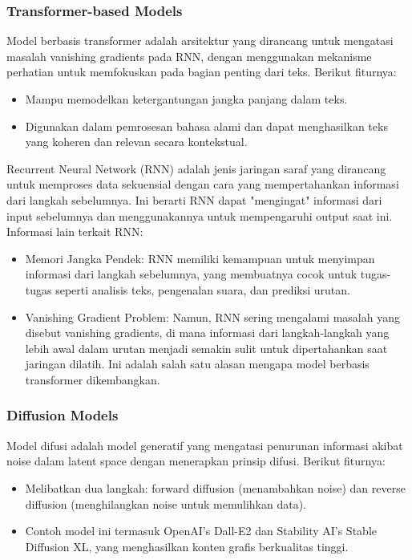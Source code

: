 \documentclass{article}
\begin{document}
\subsubsection{Transformer-based Models}
Model berbasis transformer adalah arsitektur yang dirancang untuk mengatasi masalah vanishing gradients pada RNN, dengan menggunakan mekanisme perhatian untuk memfokuskan pada bagian penting dari teks. Berikut fiturnya:
\begin{itemize}
    \item Mampu memodelkan ketergantungan jangka panjang dalam teks.
    \item Digunakan dalam pemrosesan bahasa alami dan dapat menghasilkan teks yang koheren dan relevan secara kontekstual.
\end{itemize}

Recurrent Neural Network (RNN) adalah jenis jaringan saraf yang dirancang untuk memproses data sekuensial dengan cara yang mempertahankan informasi dari langkah sebelumnya. Ini berarti RNN dapat "mengingat" informasi dari input sebelumnya dan menggunakannya untuk mempengaruhi output saat ini. Informasi lain terkait RNN:
\begin{itemize}
    \item Memori Jangka Pendek: RNN memiliki kemampuan untuk menyimpan informasi dari langkah sebelumnya, yang membuatnya cocok untuk tugas-tugas seperti analisis teks, pengenalan suara, dan prediksi urutan.
    \item Vanishing Gradient Problem: Namun, RNN sering mengalami masalah yang disebut vanishing gradients, di mana informasi dari langkah-langkah yang lebih awal dalam urutan menjadi semakin sulit untuk dipertahankan saat jaringan dilatih. Ini adalah salah satu alasan mengapa model berbasis transformer dikembangkan.
\end{itemize}

\subsubsection{Diffusion Models}
Model difusi adalah model generatif yang mengatasi penurunan informasi akibat noise dalam latent space dengan menerapkan prinsip difusi. Berikut fiturnya:
\begin{itemize}
    \item Melibatkan dua langkah: forward diffusion (menambahkan noise) dan reverse diffusion (menghilangkan noise untuk memulihkan data).
    \item Contoh model ini termasuk OpenAI's Dall-E2 dan Stability AI's Stable Diffusion XL, yang menghasilkan konten grafis berkualitas tinggi.
\end{itemize}
\end{document}
